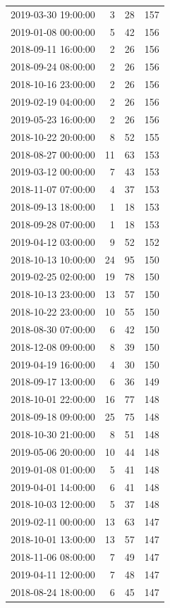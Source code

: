 \begin{tabular}{lrrr}
2019-03-30 19:00:00 & 3 & 28 & 157 \\
2019-01-08 00:00:00 & 5 & 42 & 156 \\
2018-09-11 16:00:00 & 2 & 26 & 156 \\
2018-09-24 08:00:00 & 2 & 26 & 156 \\
2018-10-16 23:00:00 & 2 & 26 & 156 \\
2019-02-19 04:00:00 & 2 & 26 & 156 \\
2019-05-23 16:00:00 & 2 & 26 & 156 \\
2018-10-22 20:00:00 & 8 & 52 & 155 \\
2018-08-27 00:00:00 & 11 & 63 & 153 \\
2019-03-12 00:00:00 & 7 & 43 & 153 \\
2018-11-07 07:00:00 & 4 & 37 & 153 \\
2018-09-13 18:00:00 & 1 & 18 & 153 \\
2018-09-28 07:00:00 & 1 & 18 & 153 \\
2019-04-12 03:00:00 & 9 & 52 & 152 \\
2018-10-13 10:00:00 & 24 & 95 & 150 \\
2019-02-25 02:00:00 & 19 & 78 & 150 \\
2018-10-13 23:00:00 & 13 & 57 & 150 \\
2018-10-22 23:00:00 & 10 & 55 & 150 \\
2018-08-30 07:00:00 & 6 & 42 & 150 \\
2018-12-08 09:00:00 & 8 & 39 & 150 \\
2019-04-19 16:00:00 & 4 & 30 & 150 \\
2018-09-17 13:00:00 & 6 & 36 & 149 \\
2018-10-01 22:00:00 & 16 & 77 & 148 \\
2018-09-18 09:00:00 & 25 & 75 & 148 \\
2018-10-30 21:00:00 & 8 & 51 & 148 \\
2019-05-06 20:00:00 & 10 & 44 & 148 \\
2019-01-08 01:00:00 & 5 & 41 & 148 \\
2019-04-01 14:00:00 & 6 & 41 & 148 \\
2018-10-03 12:00:00 & 5 & 37 & 148 \\
2019-02-11 00:00:00 & 13 & 63 & 147 \\
2018-10-01 13:00:00 & 13 & 57 & 147 \\
2018-11-06 08:00:00 & 7 & 49 & 147 \\
2019-04-11 12:00:00 & 7 & 48 & 147 \\
2018-08-24 18:00:00 & 6 & 45 & 147 \\

\end{tabular}
